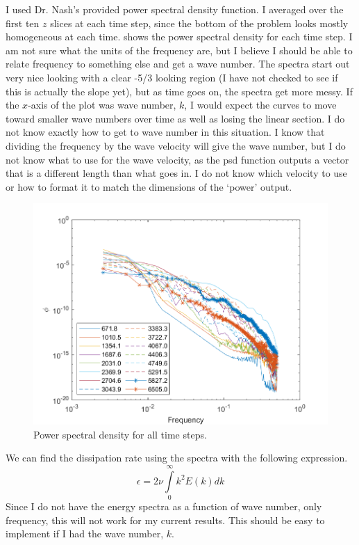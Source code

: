 \documentclass[11pt]{article}
\begin{document}
\begin{enumerate}
	I used Dr. Nash's provided power spectral density function. I averaged over the first ten $z$ slices at each time step, since the bottom of the problem looks mostly homogeneous at each time.  shows the power spectral density for each time step. I am not sure what the units of the frequency are, but I believe I should be able to relate frequency to something else and get a wave number. The spectra start out very nice looking with a clear -5/3 looking region (I have not checked to see if this is actually the slope yet), but as time goes on, the spectra get more messy. If the $x$-axis of the plot was wave number, $k$, I would expect the curves to move toward smaller wave numbers over time as well as losing the linear section. I do not know exactly how to get to wave number in this situation. I know that dividing the frequency by the wave velocity will give the wave number, but I do not know what to use for the wave velocity, as the psd function outputs a vector that is a different length than what goes in. I do not know which velocity to use or how to format it to match the dimensions of the `power' output.

	\begin{figure}[htbp]
		\centering
		\includegraphics[width=\textwidth]{1-plots/psd_plot.png}
		\caption{Power spectral density for all time steps.}
		\label{fig:psd}
	\end{figure}

	We can find the dissipation rate using the spectra with the following expression.
	\begin{equation}
		\epsilon = 2\nu \int\limits_0^{\infty} k^2 E(k) dk
	\end{equation}
	Since I do not have the energy spectra as a function of wave number, only frequency, this will not work for my current results. This should be easy to implement if I had the wave number, $k$.



\end{enumerate}
\end{document}

